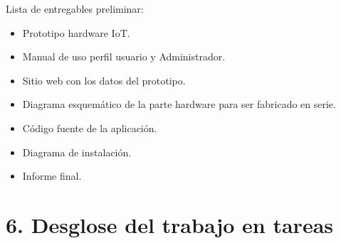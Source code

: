 \documentclass[11pt]{charter}
\begin{document}
\begin{consigna}

Lista de entregables preliminar: 
\begin{itemize}
\item Prototipo hardware IoT.
\item Manual de uso perfil usuario y Administrador.
\item Sitio web con los datos del prototipo.
\item Diagrama esquemático de la parte hardware para ser fabricado en serie.
\item Código fuente de la aplicación.
\item Diagrama de instalación.
\item Informe final.

\end{itemize}

\end{consigna}

\section{6. Desglose del trabajo en tareas}
\label{sec:wbs}
\end{document}
